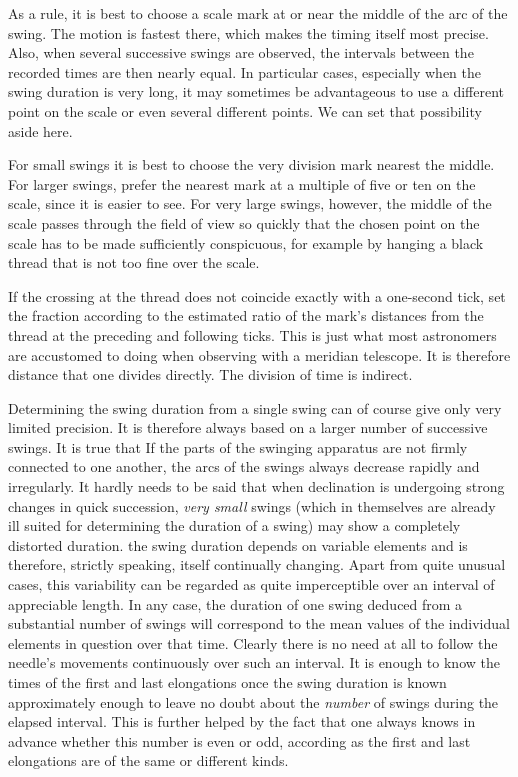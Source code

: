 As a rule, it is best to choose a scale mark at or near the middle of the arc of the swing. The motion is fastest there, which makes the timing itself most precise. Also, when several successive swings are observed, the intervals between the recorded times are then nearly equal. In particular cases, especially when the swing duration is very long, it may sometimes be advantageous to use a different point on the scale or even several different points. We can set that possibility aside here.

For small swings it is best to choose the very division mark nearest the middle. For larger swings, prefer the nearest mark at a multiple of five or ten on the scale, since it is easier to see. For very large swings, however, the middle of the scale passes through the field of view so quickly that the chosen point on the scale has to be made sufficiently conspicuous, for example by hanging a black thread that is not too fine over the scale.

If the crossing at the thread does not coincide exactly with a one-second tick, set the fraction according to the estimated ratio of the mark’s distances from the thread at the preceding and following ticks. This is just what most astronomers are accustomed to doing when observing with a meridian telescope. It is therefore distance that one divides directly. The division of time is indirect.

Determining the swing duration from a single swing can of course give only very limited precision. It is therefore always based on a larger number of successive swings. It is true that
\expandafter\def\csname HistoricalNoteText391\endcsname{If the parts of the swinging apparatus are not firmly connected to one another, the arcs of the swings always decrease rapidly and irregularly.}
\expandafter\def\csname HistoricalNoteText382\endcsname{It hardly needs to be said that when declination is undergoing strong changes in quick succession, \textit{very small} swings (which in themselves are already ill suited for determining the duration of a swing) may show a completely distorted duration.}
the swing duration depends on variable elements and is therefore, strictly speaking, itself continually changing. Apart from quite unusual cases, this variability can be regarded as quite imperceptible over an interval of appreciable length. In any case, the duration of one swing deduced from a substantial number of swings will correspond to the mean values of the individual elements in question over that time. Clearly there is no need at all to follow the needle’s movements continuously over such an interval. It is enough to know the times of the first and last elongations once the swing duration is known approximately enough to leave no doubt about the \textit{number} of swings during the elapsed interval. This is further helped by the fact that one always knows in advance whether this number is even or odd, according as the first and last elongations are of the same or different kinds.

